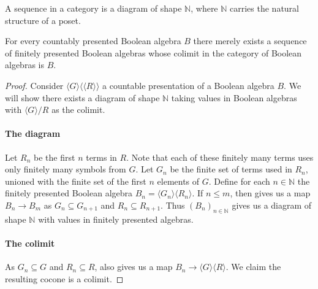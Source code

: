 \begin{definition}
  A sequence in a category is a diagram of shape $\mathbb N$, 
  where $\mathbb N$ carries the natural structure of a poset. 
\end{definition}
\begin{lemma}\label{lemProFinitePresentation}
  For every countably presented Boolean algebra $B$
  there merely exists a sequence of finitely presented Boolean algebras 
  whose colimit in the category of Boolean algebras is $B$. 
\end{lemma}
\begin{proof}
  Consider $\langle G \rangle \langle\langle R \rangle\rangle$ a countable presentation of a Boolean algebra $B$. 
  We will show there exists a diagram of shape $\mathbb N$ taking values in Boolean algebras 
  with $\langle G\rangle / R$ as the colimit.
  \paragraph{The diagram}
  Let $R_n$ be the first $n$ terms in $R$. 
  Note that each of these finitely many terms uses only finitely many symbols from $G$.
  Let $G_n$ be the finite set of terms used in $R_n$, unioned with the finite set of the first $n$ elements of $G$. 
  Define for each $n\in\mathbb N$ the finitely presented Boolean algebra $B_n = \langle G_n \rangle  \langle R_n \rangle$. 
  If $n\leq m$, then  gives us a map $B_n \to B_m$ 
  as $G_n \subseteq G_{n+1}$ and $R_n \subseteq R_{n+1}$. 
  Thus $(B_n)_{n\in \mathbb N}$ gives us a diagram of shape $\mathbb N$
  with values in finitely presented algebras. 

  \paragraph{The colimit}
  As $G_n\subseteq G$ and $R_n \subseteq R$, 
   also gives us a map $B_n\to \langle G \rangle \langle R \rangle$. 
  We claim the resulting cocone is a colimit. 


\end{proof}
